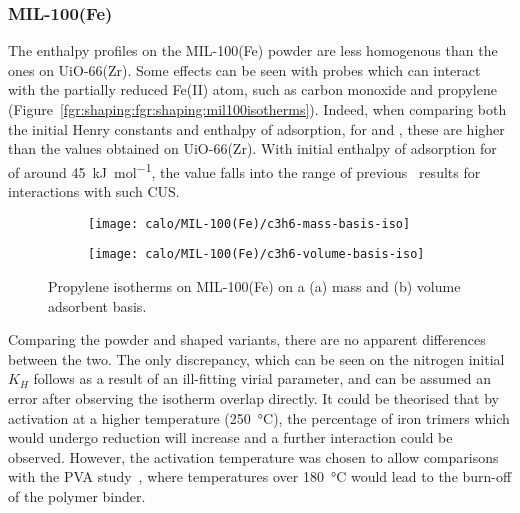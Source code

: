 
\subsubsection{MIL-100(Fe)}

The enthalpy profiles on the MIL-100(Fe) powder are less homogenous
than the ones on UiO-66(Zr). Some effects can be seen with probes which
can interact with the partially reduced Fe(II) atom, such as 
carbon monoxide and propylene (Figure~\ref{fgr:shaping:fgr:shaping:mil100isotherms}).
Indeed, when comparing both the initial Henry constants and 
enthalpy of adsorption, for  and , these are 
higher than the values obtained on UiO-66(Zr).
With initial enthalpy of adsorption for  of around
\SI{45}{\kilo\joule\per\mol}, the value falls into the range of
previous~\cite{yoonControlledReducibilityMetalOrganic2010}
results for interactions with such  CUS.

\begin{figure}[h!]
    \begin{subfigure}{0.5\textwidth}
        \texttt{[image: calo/MIL-100(Fe)/c3h6-mass-basis-iso]}
        \caption{}%
        \label{fgr:shaping:mil100c3h6adsmol}
    \end{subfigure}
    \begin{subfigure}{0.5\textwidth}
        \texttt{[image: calo/MIL-100(Fe)/c3h6-volume-basis-iso]}
        \caption{}%
        \label{fgr:shaping:mil100c3h6adsvol}
    \end{subfigure}%
    \caption{Propylene isotherms on MIL-100(Fe) on a (a) mass
    and (b) volume adsorbent basis.}%
    \label{fgr:shaping:mil100isotherms}
\end{figure}

Comparing the powder and shaped variants, there are no 
apparent differences between the two. The only discrepancy, 
which can be seen on the nitrogen initial \(K_H\) follows 
as a result of an ill-fitting virial parameter,
and can be assumed an error after observing the isotherm 
overlap directly. It could be theorised that by activation at
a higher temperature (\SI{250}{\degreeCelsius}),
the percentage of iron trimers which would undergo reduction will 
increase and a further interaction could be observed. 
However, the activation temperature was chosen to allow 
comparisons with the PVA study~\cite{chanutObservingEffectsShaping2016},
where temperatures over \SI{180}{\degreeCelsius} would lead to the 
burn-off of the polymer binder.

